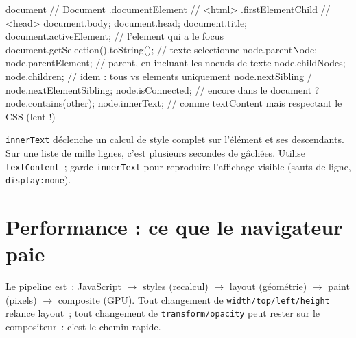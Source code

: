 \begin{codejs}
document            // Document
 .documentElement    // <html>
 .firstElementChild  // <head>
document.body; document.head; document.title;
document.activeElement;                       // l'element qui a le focus
document.getSelection().toString();           // texte selectionne
node.parentNode; node.parentElement;         // parent, en incluant les noeuds de texte
node.childNodes; node.children;               // idem : tous vs elements uniquement
node.nextSibling / node.nextElementSibling;
node.isConnected;                              // encore dans le document ?
node.contains(other);
node.innerText;                                // comme textContent mais respectant le CSS (lent !)
\end{codejs}

\begin{piege}
\verb|innerText| d\'eclenche un calcul de style complet sur l'\'el\'ement et ses descendants.
Sur une liste de mille lignes, c'est plusieurs secondes de g\^ach\'ees. Utilise
\verb|textContent|~; garde \verb|innerText| pour reproduire l'affichage visible (sauts de ligne,
\verb|display:none|).
\end{piege}

\section{Performance : ce que le navigateur paie}

Le pipeline est~: JavaScript $\rightarrow$ styles (recalcul) $\rightarrow$ layout (g\'eom\'etrie)
$\rightarrow$ paint (pixels) $\rightarrow$ composite (GPU). Tout changement de
\texttt{width/top/left/height} relance layout~; tout changement de
\texttt{transform/opacity} peut rester sur le compositeur~: c'est le chemin rapide.

